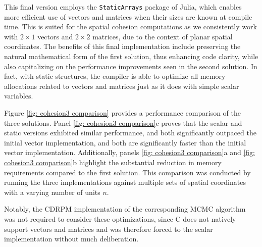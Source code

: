 \documentclass[12pt,	%
	a4paper,		%
	twoside,		%
	openright,		%
	titlepage,%
	]{book}
\theoremstyle{definition}
\newcommand{\mjline}[1]{\texttt{#1}}
\begin{document}
This final version employs the \mjline{StaticArrays} package of Julia, which enables more efficient use of vectors and matrices when their sizes are known at compile time. This is suited for the spatial cohesion computations as we consistently work with $2\times 1$ vectors and $2\times 2$ matrices, due to the context of planar spatial coordinates. The benefits of this final implementation include preserving the natural mathematical form of the first solution, thus enhancing code clarity, while also capitalizing on the performance improvements seen in the second solution. In fact, with static structures, the compiler is able to optimize all memory allocations related to vectors and matrices just as it does with simple scalar variables.

Figure \ref{fig: cohesion3 comparison} provides a performance comparison of the three solutions. Panel \ref{fig: cohesion3 comparison}c proves that the scalar and static versions exhibited similar performance, and both significantly outpaced the initial vector implementation, and both are significantly faster than the initial vector implementation. Additionally, panels \ref{fig: cohesion3 comparison}a and \ref{fig: cohesion3 comparison}b highlight the substantial reduction in memory requirements compared to the first solution. This comparison was conducted by running the three implementations against multiple sets of spatial coordinates with a varying number of units $n$.

Notably, the CDRPM implementation of the corresponding MCMC algorithm was not required to consider these optimizations, since C does not natively support vectors and matrices and was therefore forced to the scalar implementation without much deliberation.
\end{document}
